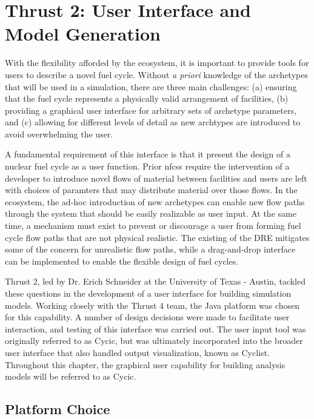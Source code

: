 \chapter{Thrust 2: User Interface and Model Generation}\label{chap:thrust2}

With the flexibility afforded by the \Cyclus ecosystem, it is important to
provide tools for users to describe a novel fuel cycle.  Without \emph{a
  priori} knowledge of the archetypes that will be used in a simulation, there
are three main challenges: (a) ensuring that the fuel cycle represents a
physically valid arrangement of facilities, (b) providing a graphical user
interface for arbitrary sets of archetype parameters, and (c) allowing for
different levels of detail as new archtypes are introduced to avoid
overwhelming the user.

A fundamental requirement of this interface is that it present the design of a
nuclear fuel cycle as a user function.  Prior \glspl{nfcs} require the
intervention of a developer to introduce novel flows of material between
facilities and users are left with choices of paramters that may distribute
material over those flows.  In the \Cyclus ecosystem, the ad-hoc introduction
of new archetypes can enable new flow paths through the system that should be
easily realizable as user input.  At the same time, a mechanism must exist to
prevent or discourage a user from forming fuel cycle flow paths that are not
physical realistic.  The existing of the \gls{DRE} mitigates some of the
concern for unrealistic flow paths, while a drag-and-drop interface can be
implemented to enable the flexible design of fuel cycles.

Thrust 2, led by Dr. Erich Schneider at the University of Texas - Austin,
tackled these questions in the development of a user interface for building
simulation models.  Working closely with the Thrust 4 team, the Java platform
was chosen for this capability.  A number of design decisions were made to
facilitate user interaction, and testing of this interface was carried out.
The user input tool was originally referred to as Cycic, but was ultimately
incorporated into the broader user interface that also handled output
visualization, known as Cyclist.  Throughout this chapter, the graphical user
capability for building analysis models will be referred to as Cycic.

\section{Platform Choice}

